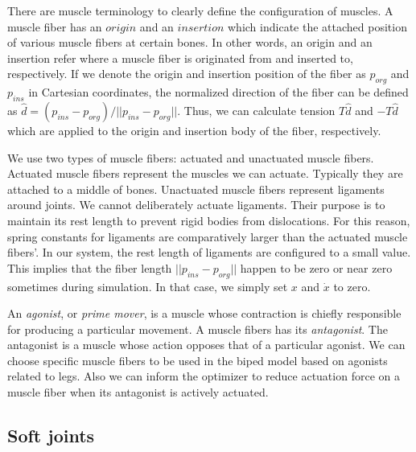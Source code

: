 \documentclass{acm_proc_article-sp}
\begin{document}
There are muscle terminology to clearly define the configuration of muscles.
A muscle fiber has an $origin$ and an $insertion$ which indicate the attached position
of various muscle fibers at certain bones.
In other words, an origin and an insertion refer where a muscle fiber is originated from and inserted to, respectively.
If we denote the origin and insertion position of the fiber as $p_{org}$ and $p_{ins}$ in Cartesian coordinates,
the normalized direction of the fiber can be defined as $\hat{d}=(p_{ins}-p_{org})/||p_{ins}-p_{org}||$.
Thus, we can calculate tension $T\hat{d}$ and $-T\hat{d}$ which are applied to the origin and insertion body of the fiber, respectively.

We use two types of muscle fibers: actuated and unactuated muscle fibers.
Actuated muscle fibers represent the muscles we can actuate. Typically
they are attached to a middle of bones. Unactuated muscle fibers represent
ligaments around joints. We cannot deliberately actuate ligaments. Their
purpose is to maintain its rest length to prevent rigid bodies from
dislocations. For this reason, spring constants for ligaments are
comparatively larger than the actuated muscle fibers'.
In our system, the rest length of ligaments are configured to a small value.
This implies that the fiber length $||p_{ins}-p_{org}||$ happen to be zero
or near zero sometimes during simulation. In that case, we simply set
$x$ and $\dot{x}$ to zero.

An \emph{agonist}, or \emph{prime mover}, is a muscle whose contraction is chiefly responsible for producing a particular movement.
A muscle fibers has its \emph{antagonist}. The antagonist is a muscle whose action opposes that of a particular agonist.
We can choose specific muscle fibers to be used in the biped model based on agonists related to legs.
Also we can inform the optimizer to reduce actuation force on a muscle fiber when its antagonist is actively actuated.

\subsection{Soft joints}
\end{document}
